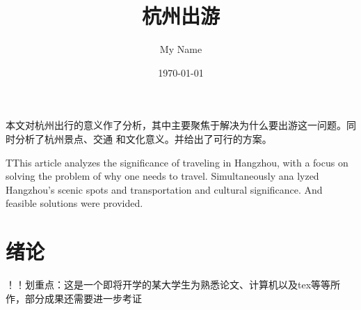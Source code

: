\documentclass[a4paper,12pt]{article}
\begin{document}
\title {杭州出游}
\author{My Name}
\date{\today}
\maketitle

\renewcommand{\abstractname}{\textbf{\zihao{4}摘\quad 要}}
\begin{onecolabstract}
  本文对杭州出行的意义作了分析，其中主要聚焦于解决为什么要出游这一问题。同时分析了杭州景点、交通
  和文化意义。并给出了可行的方案。

  

\end{onecolabstract}
\renewcommand{\abstractname}{\textbf{Abstract}}
\begin{onecolabstract}
  TThis article analyzes the significance of traveling in Hangzhou, 
  with a focus on solving the problem of why one needs to travel. Simultaneously ana
  lyzed Hangzhou's scenic spots and transportation 
  and cultural significance. And feasible solutions were provided.

\end{onecolabstract}
\newpage
\begin{center}
  \tableofcontents
\end{center}


\newpage
{}

\section{绪论}
  ！！划重点：这是一个即将开学的某大学生为熟悉论文、计算机以及tex等等所作，部分成果还需要进一步考证
\end{document}
